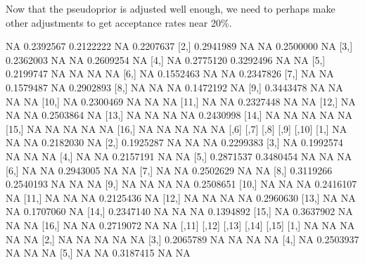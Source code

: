 \documentclass[11pt]{article}
\begin{document}
Now that the pseudoprior is adjusted well enough, we need to perhaps
make other adjustments to get acceptance rates near 20\%.
\begin{Schunk}
\begin{Soutput}
           [,1]      [,2]      [,3]      [,4]      [,5]
 [1,]        NA 0.2392567 0.2122222        NA 0.2207637
 [2,] 0.2941989        NA        NA 0.2500000        NA
 [3,] 0.2362003        NA        NA 0.2609254        NA
 [4,]        NA 0.2775120 0.3292496        NA        NA
 [5,] 0.2199747        NA        NA        NA        NA
 [6,]        NA 0.1552463        NA        NA 0.2347826
 [7,]        NA        NA 0.1579487        NA 0.2902893
 [8,]        NA        NA        NA 0.1472192        NA
 [9,] 0.3443478        NA        NA        NA        NA
[10,]        NA 0.2300469        NA        NA        NA
[11,]        NA        NA 0.2327448        NA        NA
[12,]        NA        NA        NA 0.2503864        NA
[13,]        NA        NA        NA        NA 0.2430998
[14,]        NA        NA        NA        NA        NA
[15,]        NA        NA        NA        NA        NA
[16,]        NA        NA        NA        NA        NA
           [,6]      [,7]      [,8]      [,9]     [,10]
 [1,]        NA        NA        NA 0.2182030        NA
 [2,] 0.1925287        NA        NA        NA 0.2299383
 [3,]        NA 0.1992574        NA        NA        NA
 [4,]        NA        NA 0.2157191        NA        NA
 [5,] 0.2871537 0.3480454        NA        NA        NA
 [6,]        NA        NA 0.2943005        NA        NA
 [7,]        NA        NA 0.2502629        NA        NA
 [8,] 0.3119266 0.2540193        NA        NA        NA
 [9,]        NA        NA        NA        NA 0.2508651
[10,]        NA        NA        NA 0.2416107        NA
[11,]        NA        NA        NA 0.2125436        NA
[12,]        NA        NA        NA        NA 0.2960630
[13,]        NA        NA        NA 0.1707060        NA
[14,] 0.2347140        NA        NA        NA 0.1394892
[15,]        NA 0.3637902        NA        NA        NA
[16,]        NA        NA 0.2719072        NA        NA
          [,11]     [,12]     [,13]     [,14]     [,15]
 [1,]        NA        NA        NA        NA        NA
 [2,]        NA        NA        NA        NA        NA
 [3,] 0.2065789        NA        NA        NA        NA
 [4,]        NA 0.2503937        NA        NA        NA
 [5,]        NA        NA 0.3187415        NA        NA

\end{Soutput}
\end{Schunk}
\end{document}
